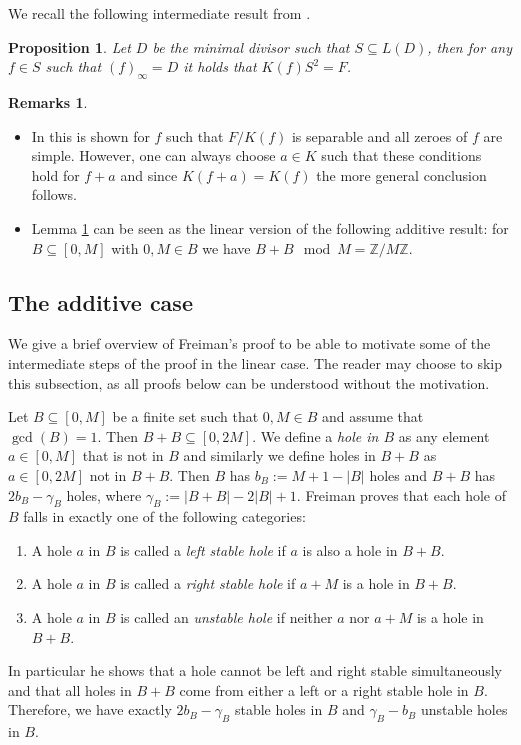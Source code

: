 \documentclass[12pt]{amsart}
\newcommand{\Z}{\mathbb{Z}}
\newtheorem{proposition}[theorem]{Proposition}
\theoremstyle{definition}
\newtheorem{remarks}[theorem]{Remarks}
\begin{document}
	We recall the following intermediate result from \cite{couvreur2024freimanproof}.
	\begin{proposition}\label{prop:KfS2}
		Let $D$ be the minimal divisor such that $S \subseteq L(D)$, then for any $f \in S$ such that $(f)_\infty = D$ it holds that $K(f)S^2 = F$. 
	\end{proposition}
	
	\begin{remarks}~
		\begin{itemize}
			\item In \cite{couvreur2024freimanproof} this is shown for $f$ such that $F/K(f)$ is separable and all zeroes of $f$ are simple. However, one can always choose $a \in K$ such that these conditions hold for $f + a$ and since $K(f+a) = K(f)$ the more general conclusion follows. 
			\item Lemma \ref{prop:KfS2} can be seen as the linear version of the following additive result: for $B \subseteq [0, M]$ with $0, M \in B$ we have $B+B \mod M = \Z/M\Z$. 
		\end{itemize}
	\end{remarks}
	
	\subsection{The additive case} 
	We give a brief overview of Freiman's proof to be able to motivate some of the intermediate steps of the proof in the linear case. The reader may choose to skip this subsection, as all proofs below can be understood without the motivation. 
	
	Let $B \subseteq [0, M]$ be a finite set such that $0, M \in B$ and assume that $\gcd (B) = 1$. Then $B+B \subseteq [0, 2M]$. We define a \textit{hole in $B$} as any element $a \in [0, M]$ that is not in $B$ and similarly we define holes in $B+B$ as $a \in [0, 2M]$ not in $B+B$. Then $B$ has $b_B := M + 1 - |B|$ holes and $B+B$ has $2b_B - \gamma_B$ holes, where $\gamma_B := |B+B| - 2|B| + 1$. 
	Freiman proves that each hole of $B$ falls in exactly one of the following categories: 
	\begin{enumerate}[\normalfont (i)]
		\item A hole $a$ in $B$ is called a \textit{left stable hole} if $a$ is also a hole in $B+B$.
		\item A hole $a$ in $B$ is called a \textit{right stable hole} if $a + M$ is a hole in $B+B$. 
		\item A hole $a$ in $B$ is called an \textit{unstable hole} if neither $a$ nor $a + M$ is a hole in $B+B$. 
	\end{enumerate}
	In particular he shows that a hole cannot be left and right stable simultaneously and that all holes in $B+B$ come from either a left or a right stable hole in $B$. Therefore, we have exactly $2b_B - \gamma_B$ stable holes in $B$ and $\gamma_B - b_B$ unstable holes in $B$. 
	
\end{document}
